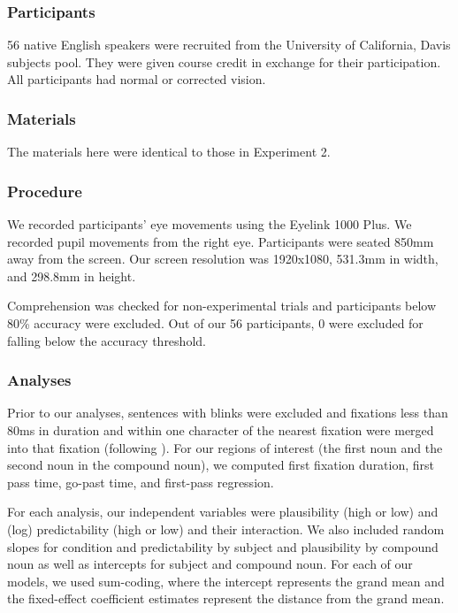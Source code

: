 \documentclass[
  12pt,
  letterpaper,
]{scrreprt}
\begin{document}
\subsubsection{Participants}\label{participants-3}

56 native English speakers were recruited from the University of
California, Davis subjects pool. They were given course credit in
exchange for their participation. All participants had normal or
corrected vision.

\subsubsection{Materials}\label{materials-1}

The materials here were identical to those in Experiment 2.

\subsubsection{Procedure}\label{procedure-2}

We recorded participants' eye movements using the Eyelink 1000 Plus. We
recorded pupil movements from the right eye. Participants were seated
850mm away from the screen. Our screen resolution was 1920x1080, 531.3mm
in width, and 298.8mm in height.

Comprehension was checked for non-experimental trials and participants
below 80\% accuracy were excluded. Out of our 56 participants, 0 were
excluded for falling below the accuracy threshold.

\subsubsection{Analyses}\label{analyses-1}

Prior to our analyses, sentences with blinks were excluded and fixations
less than 80ms in duration and within one character of the nearest
fixation were merged into that fixation (following
). For
our regions of interest (the first noun and the second noun in the
compound noun), we computed first fixation duration, first pass time,
go-past time, and first-pass regression.

For each analysis, our independent variables were plausibility (high or
low) and (log) predictability (high or low) and their interaction. We
also included random slopes for condition and predictability by subject
and plausibility by compound noun as well as intercepts for subject and
compound noun. For each of our models, we used sum-coding, where the
intercept represents the grand mean and the fixed-effect coefficient
estimates represent the distance from the grand mean.
\end{document}

